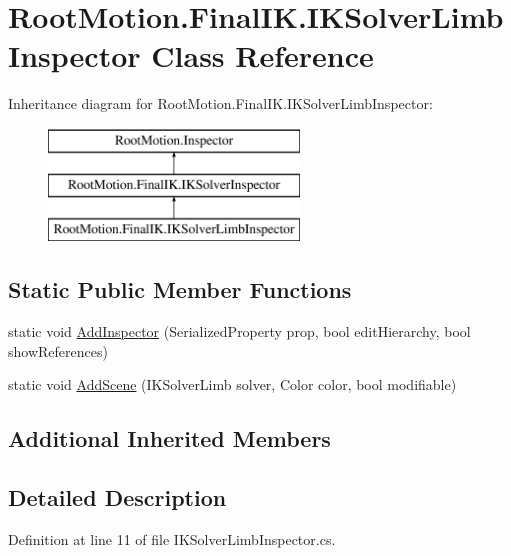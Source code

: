 \hypertarget{class_root_motion_1_1_final_i_k_1_1_i_k_solver_limb_inspector}{}\section{Root\+Motion.\+Final\+I\+K.\+I\+K\+Solver\+Limb\+Inspector Class Reference}
\label{class_root_motion_1_1_final_i_k_1_1_i_k_solver_limb_inspector}
Inheritance diagram for Root\+Motion.\+Final\+I\+K.\+I\+K\+Solver\+Limb\+Inspector\+:\begin{figure}[H]
\begin{center}
\leavevmode
\includegraphics[height=3.000000cm]{class_root_motion_1_1_final_i_k_1_1_i_k_solver_limb_inspector}
\end{center}
\end{figure}
\subsection*{Static Public Member Functions}
\begin{DoxyCompactItemize}
\item 
static void \mbox{\hyperlink{class_root_motion_1_1_final_i_k_1_1_i_k_solver_limb_inspector_a2f9af8b1d9ba2ed968a4f24bdb479066}{Add\+Inspector}} (Serialized\+Property prop, bool edit\+Hierarchy, bool show\+References)
\item 
static void \mbox{\hyperlink{class_root_motion_1_1_final_i_k_1_1_i_k_solver_limb_inspector_a8294e7967868a328fa7624afc7e4ac7d}{Add\+Scene}} (I\+K\+Solver\+Limb solver, Color color, bool modifiable)
\end{DoxyCompactItemize}
\subsection*{Additional Inherited Members}


\subsection{Detailed Description}


Definition at line 11 of file I\+K\+Solver\+Limb\+Inspector.\+cs.



